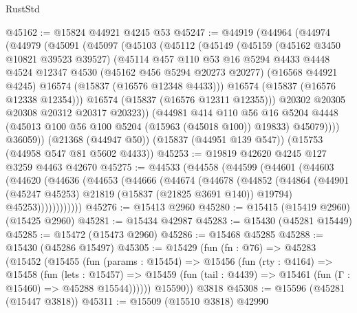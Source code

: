 \begin{lexlean}{RustStd}
\begin{coremodule}
{\begin{coremodule}
{{{{{{{{{{{{{{{{{{{{{{{{{{{{{{{{{{{{{{{{{{{{{{{{{{{{{{{{{{{{@45162 := @15824 @44921 @4245 @53
@45247 := @44919
    (@44964
      (@44974
        (@44979
          (@45091
            (@45097
              (@45103
                (@45112
                  (@45149
                    (@45159
                      (@45162 @3450 @10821 @39523 @39527)
                      (@45114
                        @457
                        @110
                        @53
                        @16
                        @5294
                        @4433
                        @4448
                        @4524
                        @12347
                        @4530
                        (@45162 @456 @5294 @20273 @20277)
                        (@16568 @44921 @4245)
                        @16574
                        (@15837 (@16576 @12348 @4433)))
                      @16574
                      (@15837 (@16576 @12338 @12354)))
                    @16574
                    (@15837 (@16576 @12311 @12355)))
                  @20302
                  @20305
                  @20308
                  @20312
                  @20317
                  @20323))
              (@44981
                @414
                @110
                @56
                @16
                @5204
                @4448
                (@45013 @100 @56 @100 @5204 (@15963 (@45018 @100)) @19833)
                @45079))))
        @36059))
    (@21368 (@44947 @50))
    (@15837 (@44951 @139 @547))
    (@15753 (@44958 @547 @81 @5602 @4433))
@45253 := @19819 @42620 @4245 @127 @3259 @4463 @42670
@45275 := @44533
    (@44558
      (@44599
        (@44601
          (@44603
            (@44620
              (@44636
                (@44653
                  (@44666
                    (@44674
                      (@44678
                        (@44852
                          (@44864
                            (@44901 (@45247 @45253) @21819 (@15837 (@21825 @3691 @140)) @19794)
                            @45253))))))))))))
@45276 := @15413 @2960
@45280 := @15415 (@15419 @2960) (@15425 @2960)
@45281 := @15434 @42987
@45283 := @15430 (@45281 @15449)
@45285 := @15472 (@15473 @2960)
@45286 := @15468 @45285
@45288 := @15430 (@45286 @15497)
@45305 := @15429
    (fun (fn : @76) =>
    @45283
      (@15452
        (@15455
          (fun (params : @15454) =>
          @15456
            (fun (rty : @4164) =>
            @15458
              (fun (lets : @15457) =>
              @15459 (fun (tail : @4439) => @15461 (fun (Γ : @15460) => @45288 @15544))))))
        @15590))
    @3818
@45308 := @15596 (@45281 (@15447 @3818))
@45311 := @15509 (@15510 @3818) @42990
}}}}}}}}}}}}}}}}}}}}}}}}}}}}}}}}}}}}}}}}}}}}}}}}}}}}}}}}}}}}
\end{coremodule}}
\end{coremodule}
\end{lexlean}
